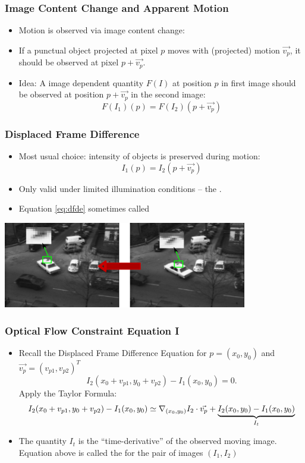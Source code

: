 \documentclass[10pt]{beamer}
\newcommand{\myemph}[1]{{\color{blue}{#1}}}
\begin{document}
\begin{frame}
  \frametitle{Image Content Change and Apparent Motion}
  \begin{itemize}
  \item Motion is observed via image content change:\vfill
  \item If a punctual object projected at pixel $p$ moves with (projected) motion
    $\vec{v_p}$, it should be observed at pixel $p+\vec{v_p}$.\vfill
  \item Idea: A image dependent quantity $F(I)$ at position $p$ in first image should be
    observed at position $p+\vec{v_p}$ in the second image:
    $$
    F(I_1)(p) = F(I_2)(p+\vec{v_p})
    $$\vfill
  \end{itemize}
\end{frame}

\begin{frame}
  \frametitle{Displaced Frame Difference}
  \begin{itemize}
  \item Most usual choice: intensity of objects is preserved during motion:
    \begin{equation}
      \label{eq:dfde}
      I_1(p) = I_2(p+\vec{v_p})
    \end{equation}
  \item Only valid under limited illumination conditions -- the \myemph{Lambertian Model}.
  \item Equation \eqref{eq:dfde} sometimes called \myemph{Displaced Frame Difference Equation (DFDE)}
  \end{itemize}
  \begin{center}
    \includegraphics[width=0.8\textwidth]{FIGURES/taxiframemotion}
  \end{center}
\end{frame}




\begin{frame}
  \frametitle{Optical Flow Constraint Equation I}
  \begin{itemize}
  \item Recall the Displaced Frame Difference Equation for $p=(x_0,y_0)$ and $\vec{v_p} = (v_{p1},v_{p2})^T$
    $$
    I_2(x_0 + v_{p1}, y_0 + v_{p2}) - I_1(x_0,y_0) = 0.
    $$
    Apply the Taylor Formula:
    $$
    I_2(x_0 + v_{p1}, y_0 + v_{p2}) - I_1(x_0,y_0) \simeq \nabla_{(x_0,y_0)} I_2\cdot \vec{v_p} + \underset{I_t}{\underbrace{I_2(x_0,y_0)-I_1(x_0,y_0)}}
    $$
  \item The quantity $I_t$ is the ``time-derivative'' of the observed
    moving image. Equation above is called the \myemph{Optical Flow
      Constraint Equation} for the pair of images $(I_1,I_2)$
  \end{itemize}
\end{frame}
\end{document}
